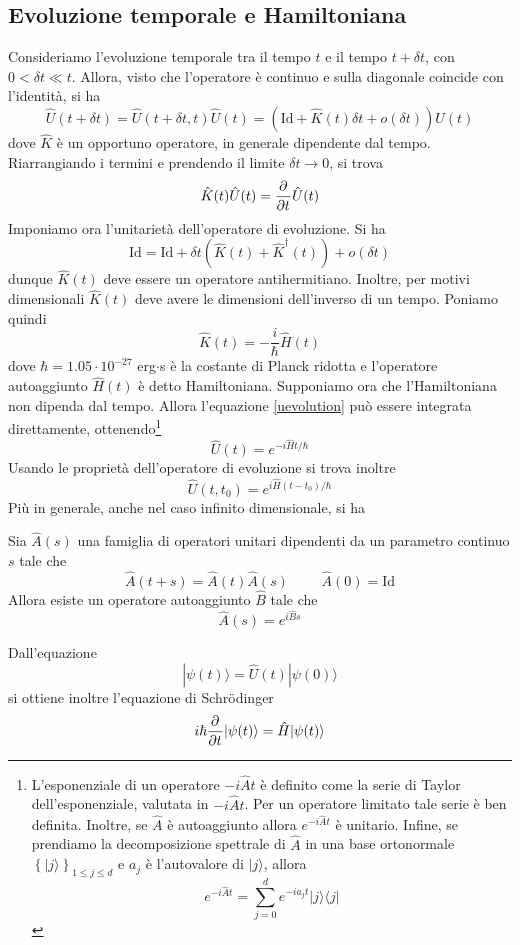 \documentclass[a4paper, 11pt]{article}
\newcommand{\id}{\mathrm{Id}}
\newcommand{\ham}{\hat{H}}
\renewcommand{\U}{\hat{U}}
\renewcommand{\ket}[1]{| #1\rangle}
\renewcommand{\bra}[1]{\langle #1|}
\begin{document}
\subsection{Evoluzione temporale e Hamiltoniana}
Consideriamo l'evoluzione temporale tra il tempo $t$ e il tempo $t+\delta t$, con $0<\delta t\ll t$. Allora, visto che l'operatore è continuo e sulla diagonale coincide con l'identità, si ha\[\U(t+\delta t)=\U(t+\delta t,t)\U(t)=(\id+\hat{K}(t)\delta t+o(\delta t))\U(t)\]
dove $\hat{K}$ è un opportuno operatore, in generale dipendente dal tempo. Riarrangiando i termini e prendendo il limite $\delta t\to0$, si trova
\begin{equation}\hat{K}(t)\U(t)=\pder{}{t}\U(t)\label{uevolution}\end{equation}
Imponiamo ora l'unitarietà dell'operatore di evoluzione. Si ha
\[\id=\id+\delta t(\hat{K}(t)+\hat{K}^\dagger(t))+o(\delta t)\]
dunque $\hat{K}(t)$ deve essere un operatore antihermitiano. Inoltre, per motivi dimensionali $\hat{K}(t)$ deve avere le dimensioni dell'inverso di un tempo. Poniamo quindi
\[\hat{K}(t)=-\frac{i}{\hbar}\ham(t)\]
dove $\hbar=1.05\cdot10^{-27}$ erg$\cdot$s è la costante di Planck ridotta e l'operatore autoaggiunto $\hat{H}(t)$ è detto Hamiltoniana. Supponiamo ora che l'Hamiltoniana non dipenda dal tempo. Allora l'equazione \ref{uevolution} può essere integrata direttamente, ottenendo\footnote{L'esponenziale di un operatore $-i\hat{A}t$ è definito come la serie di Taylor dell'esponenziale, valutata in $-i\hat{A}t$. Per un operatore limitato tale serie è ben definita. Inoltre, se $\hat{A}$ è autoaggiunto allora $e^{-i\hat{A}t}$ è unitario. Infine, se prendiamo la decomposizione spettrale di $\hat{A}$ in una base ortonormale $\left\{\ket{j}\right\}_{1\leq j\leq d}$ e $a_j$ è l'autovalore di $\ket{j}$, allora
\[e^{-i\hat{A}t}=\sum_{j=0}^{d}e^{-ia_jt}\ket{j}\bra{j}\]}
\[\U(t)=e^{-i\ham t/\hbar}\]
Usando le proprietà dell'operatore di evoluzione si trova inoltre
\[\U(t,t_0)=e^{i\ham (t-t_0)/\hbar}\]
Più in generale, anche nel caso infinito dimensionale, si ha
\begin{theorem}[Stone] Sia $\hat{A}(s)$ una famiglia di operatori unitari dipendenti da un parametro continuo $s$ tale che
	\[\hat{A}(t+s)=\hat{A}(t)\hat{A}(s)\,\,\,\,\,\,\,\,\,\,\,\,\,\,\hat{A}(0)=\id\]
	Allora esiste un operatore autoaggiunto $\hat{B}$ tale che
	\[\hat{A}(s)=e^{i\hat{B}s}\]
\end{theorem}
	Dall'equazione
	\[\ket{\psi(t)}=\U(t)\ket{\psi(0)}\]
	si ottiene inoltre l'equazione di Schr\"odinger
	\[i\hbar\pder{}{t}\ket{\psi(t)}=\ham\ket{\psi(t)}\]
\end{document}
